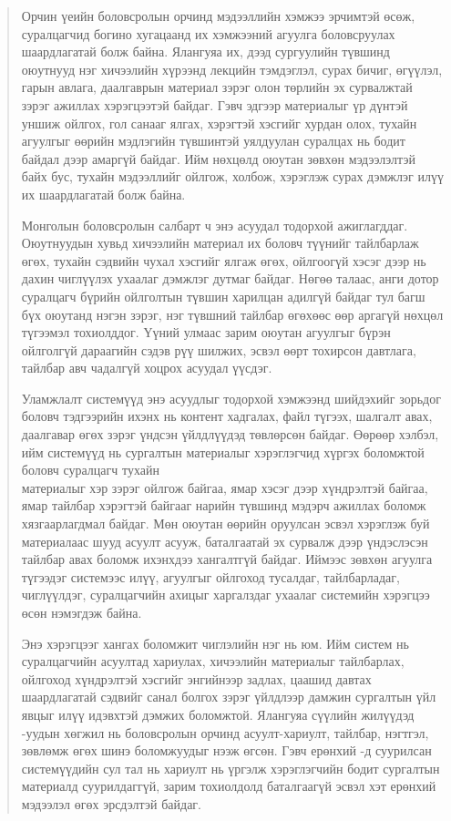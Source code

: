 
\fontsize{12pt}{14.4pt}\selectfont
\begin{abstract}

Орчин үеийн боловсролын орчинд мэдээллийн хэмжээ эрчимтэй өсөж, суралцагчид богино хугацаанд их хэмжээний агуулга боловсруулах шаардлагатай болж байна. Ялангуяа их, дээд сургуулийн түвшинд оюутнууд нэг хичээлийн хүрээнд лекцийн тэмдэглэл, сурах бичиг, өгүүлэл, гарын авлага, даалгаврын материал зэрэг олон төрлийн эх сурвалжтай зэрэг ажиллах хэрэгцээтэй байдаг. Гэвч эдгээр материалыг үр дүнтэй уншиж ойлгох, гол санааг ялгах, хэрэгтэй хэсгийг хурдан олох, тухайн агуулгыг өөрийн мэдлэгийн түвшинтэй уялдуулан суралцах нь бодит байдал дээр амаргүй байдаг. Ийм нөхцөлд оюутан зөвхөн мэдээлэлтэй байх бус, тухайн мэдээллийг ойлгож, холбож, хэрэглэж сурах дэмжлэг илүү их шаардлагатай болж байна.

Монголын боловсролын салбарт ч энэ асуудал тодорхой ажиглагддаг. Оюутнуудын хувьд хичээлийн материал их боловч түүнийг тайлбарлаж өгөх, тухайн сэдвийн чухал хэсгийг ялгаж өгөх, ойлгоогүй хэсэг дээр нь дахин чиглүүлэх ухаалаг дэмжлэг дутмаг байдаг. Нөгөө талаас, анги дотор суралцагч бүрийн ойлголтын түвшин харилцан адилгүй байдаг тул багш бүх оюутанд нэгэн зэрэг, нэг түвшний тайлбар өгөхөөс өөр аргагүй нөхцөл түгээмэл тохиолддог. Үүний улмаас зарим оюутан агуулгыг бүрэн ойлголгүй дараагийн сэдэв рүү шилжих, эсвэл өөрт тохирсон давтлага, тайлбар авч чадалгүй хоцрох асуудал үүсдэг.

Уламжлалт  системүүд энэ асуудлыг тодорхой хэмжээнд шийдэхийг зорьдог боловч тэдгээрийн ихэнх нь контент хадгалах, файл түгээх, шалгалт авах, даалгавар өгөх зэрэг үндсэн үйлдлүүдэд төвлөрсөн байдаг. Өөрөөр хэлбэл, ийм системүүд нь сургалтын материалыг хэрэглэгчид хүргэх боломжтой боловч суралцагч тухайн \\ материалыг хэр зэрэг ойлгож байгаа, ямар хэсэг дээр хүндрэлтэй байгаа, ямар тайлбар хэрэгтэй байгааг нарийн түвшинд мэдэрч ажиллах боломж хязгаарлагдмал байдаг. Мөн оюутан өөрийн оруулсан эсвэл хэрэглэж буй материалаас шууд асуулт асууж, баталгаатай эх сурвалж дээр үндэслэсэн тайлбар авах боломж ихэнхдээ хангалтгүй байдаг. Иймээс зөвхөн агуулга түгээдэг системээс илүү, агуулгыг ойлгоход тусалдаг, тайлбарладаг, чиглүүлдэг, суралцагчийн ахицыг харгалздаг ухаалаг системийн хэрэгцээ өсөн нэмэгдэж байна.

Энэ хэрэгцээг хангах боломжит чиглэлийн нэг нь  юм. Ийм систем нь суралцагчийн асуултад хариулах, хичээлийн материалыг тайлбарлах, ойлгоход хүндрэлтэй хэсгийг энгийнээр задлах, цаашид давтах шаардлагатай сэдвийг санал болгох зэрэг үйлдлээр дамжин сургалтын үйл явцыг илүү идэвхтэй дэмжих боломжтой. Ялангуяа сүүлийн жилүүдэд -уудын хөгжил нь боловсролын орчинд асуулт-хариулт, тайлбар, нэгтгэл, зөвлөмж өгөх шинэ боломжуудыг нээж өгсөн. Гэвч ерөнхий -д суурилсан системүүдийн сул тал нь хариулт нь үргэлж хэрэглэгчийн бодит сургалтын материалд суурилдаггүй, зарим тохиолдолд баталгаагүй эсвэл хэт ерөнхий мэдээлэл өгөх эрсдэлтэй байдаг.


\end{abstract}
